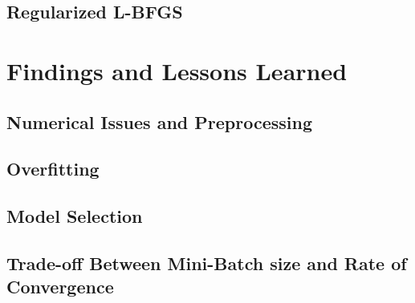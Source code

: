 \documentclass[twoside,12pt]{article}
\begin{document}
\subsection{ Regularized L-BFGS}

\section{Findings and Lessons Learned}
\subsection{Numerical Issues and Preprocessing}
\subsection{Overfitting}
\subsection{Model Selection}
\subsection{Trade-off Between Mini-Batch size and Rate of Convergence}
\end{document}

